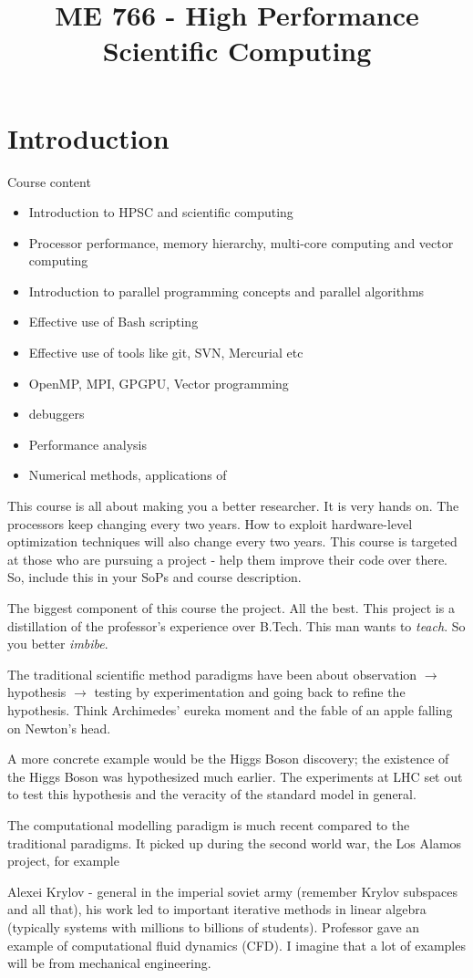 \documentclass[a4paper]{article}
\title{ME 766 - High Performance Scientific Computing}
\begin{document}
\section{Introduction}
Course content
\begin{itemize}
	\item Introduction to HPSC and scientific computing
	\item Processor performance, memory hierarchy, multi-core computing and vector computing
	\item Introduction  to parallel programming concepts and parallel algorithms
	\item Effective use of Bash scripting
	\item Effective use of tools like git, SVN, Mercurial etc
	\item OpenMP, MPI, GPGPU, Vector programming
	\item debuggers
	\item Performance analysis
	\item Numerical methods, applications of 
\end{itemize}

This course is all about making you a better researcher. It
is very hands on.
The processors keep changing every two years.
How to exploit hardware-level optimization techniques will also
change every two years. This course is targeted at those who are
pursuing a project - help them improve their code over there. So,
include this in your SoPs and course description. 

The biggest component of this course the project. All the best.
This project is a distillation of the professor's experience over
B.Tech. This man wants to \emph{teach}. So you better \emph{imbibe}. 

The traditional scientific method paradigms have been about observation 
$\to $ hypothesis $\to $ testing by experimentation and going back
to refine the hypothesis. Think Archimedes' eureka moment and
the fable of an apple falling on Newton's head.

A more concrete example would be the Higgs Boson discovery; the 
existence of the Higgs Boson was hypothesized much earlier.
The experiments at LHC set out to test this hypothesis and the
veracity of the standard model in general.

The computational modelling paradigm is much recent compared to the
traditional paradigms. It picked up during the second world war,
the Los Alamos project, for example

Alexei Krylov - general in the imperial soviet army (remember Krylov
subspaces and all that), his work led to important iterative methods
in linear algebra (typically systems with millions to billions of students).
Professor gave an example of computational fluid dynamics (CFD). I imagine
that a lot of examples will be from mechanical engineering.
\end{document}
